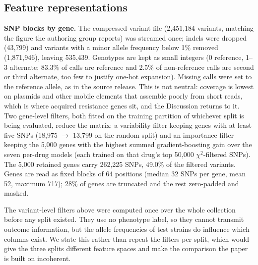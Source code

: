 \subsection*{Feature representations}
\textbf{SNP blocks by gene.} The compressed variant file (2,451,184 variants, matching the figure
the authoring group reports) was streamed once; indels were dropped (43,799) and variants with a
minor allele frequency below 1\% removed (1,871,946), leaving 535,439. Genotypes are kept as small
integers (0 reference, 1--3 alternate; 83.3\% of calls are reference and 2.5\% of non-reference
calls are second or third alternate, too few to justify one-hot expansion). Missing calls were set
to the reference allele, as in the source release. This is not neutral: coverage is lowest on
plasmids and other mobile elements that assemble poorly from short reads, which is where acquired
resistance genes sit, and the Discussion returns to it. Two gene-level filters, both fitted on the
training partition of whichever split is being evaluated, reduce the matrix: a variability filter
keeping genes with at least five SNPs (18,975 $\rightarrow$ 13,799 on the random split) and an
importance filter keeping the 5,000 genes with the highest summed gradient-boosting gain over the
seven per-drug models (each trained on that drug's top 50,000 $\chi^2$-filtered SNPs). The 5,000
retained genes carry 262,225 SNPs, 49.0\% of the filtered variants. Genes are read as fixed blocks
of 64 positions (median 32 SNPs per gene, mean 52, maximum 717); 28\% of genes are truncated and
the rest zero-padded and masked.

The variant-level filters above were computed once over the whole collection before any split
existed. They use no phenotype label, so they cannot transmit outcome information, but the allele
frequencies of test strains do influence which columns exist. We state this rather than repeat the
filters per split, which would give the three splits different feature spaces and make the
comparison the paper is built on incoherent.

